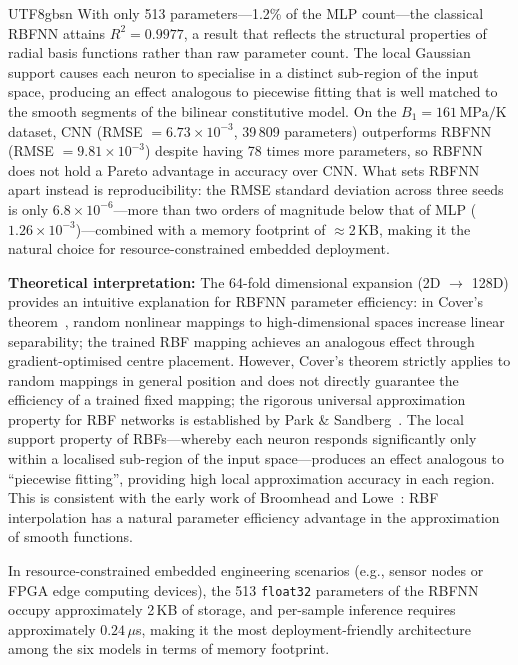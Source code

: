 \documentclass[a4paper,12pt]{report}
\begin{document}
\begin{CJK}{UTF8}{gbsn}
With only 513 parameters---1.2\% of the MLP count---the classical RBFNN attains
$R^2 = 0.9977$, a result that reflects the structural properties of radial basis
functions rather than raw parameter count. The local Gaussian support causes each neuron
to specialise in a distinct sub-region of the input space, producing an effect analogous
to piecewise fitting that is well matched to the smooth segments of the bilinear
constitutive model. On the $B_1 = 161\,\mathrm{MPa/K}$ dataset, CNN
(RMSE $= 6.73 \times 10^{-3}$, 39\,809 parameters) outperforms RBFNN
(RMSE $= 9.81 \times 10^{-3}$) despite having 78 times more parameters, so RBFNN
does not hold a Pareto advantage in accuracy over CNN. What sets RBFNN apart instead
is reproducibility: the RMSE standard deviation across three seeds is only
$6.8 \times 10^{-6}$---more than two orders of magnitude below that of
MLP ($1.26 \times 10^{-3}$)---combined with a memory footprint of $\approx$2\,KB,
making it the natural choice for resource-constrained embedded deployment.

\textbf{Theoretical interpretation:} The 64-fold dimensional expansion (2D $\to$ 128D)
provides an intuitive explanation for RBFNN parameter efficiency: in Cover's
theorem~\cite{cover1965}, random nonlinear mappings to high-dimensional spaces increase
linear separability; the trained RBF mapping achieves an analogous effect through
gradient-optimised centre placement. However, Cover's theorem strictly applies to
random mappings in general position and does not directly guarantee the efficiency of
a trained fixed mapping; the rigorous universal approximation property for RBF networks
is established by Park \& Sandberg~\cite{park1991rbf}. The local support property of
RBFs---whereby each neuron responds significantly only within a localised sub-region of
the input space---produces an effect analogous to ``piecewise fitting'', providing high
local approximation accuracy in each region. This is consistent with the early work of
Broomhead and Lowe~\cite{broomhead1988}: RBF interpolation has a natural parameter
efficiency advantage in the approximation of smooth functions.

In resource-constrained embedded engineering scenarios (e.g., sensor nodes or FPGA edge
computing devices), the 513 \texttt{float32} parameters of the RBFNN occupy approximately
2\,KB of storage, and per-sample inference requires approximately $0.24\,\mu$s, making it
the most deployment-friendly architecture among the six models in terms of memory footprint.


\end{CJK}
\end{document}
